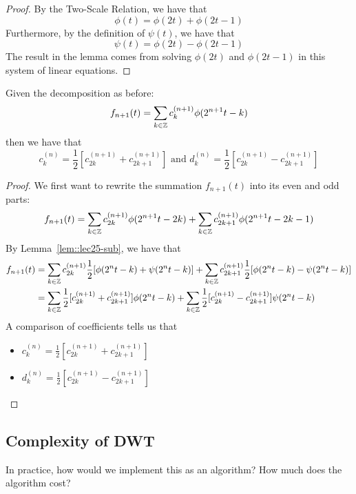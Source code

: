 \documentclass{article}
\begin{document}
\begin{proof}
    By the Two-Scale Relation, we have that
    \[\phi(t) = \phi(2t) + \phi(2t - 1)\]
    Furthermore, by the definition of $\psi(t)$, we have that
    \[\psi(t) = \phi(2t) - \phi(2t - 1)\]
    The result in the lemma comes from solving $\phi(2t)$ and $\phi(2t - 1)$ in this system of linear equations.
\end{proof}

\begin{proposition}\label{prop::lec25-rewrite-rule}
    Given the decomposition as before:
    \[f_{n + 1}(t) = \sum_{k \in \mathbb{Z}} c_k^{(n+1)} \phi(2^{n+1} t - k)\]
    then we have that
    \[c_k^{(n)} = \frac{1}{2} [c_{2k}^{(n+1)} + c_{2k+1}^{(n+1)}] \text{ and } d_k^{(n)} = \frac{1}{2} [c_{2k}^{(n+1)} - c_{2k+1}^{(n+1)}]\]
\end{proposition}

\begin{proof}
    We first want to rewrite the summation $f_{n+1}(t)$ into its even and odd parts:
    \[f_{n+1}(t) = \sum_{k \in \mathbb{Z}} c_{2k}^{(n+1)} \phi(2^{n+1} t - 2k) + \sum_{k \in \mathbb{Z}} c_{2k+1}^{(n+1)} \phi(2^{n+1} t - 2k - 1)\]
    By Lemma~\ref{lem::lec25-sub}, we have that
    \begin{align*}
        f_{n+1}(t) &= \sum_{k \in \mathbb{Z}} c_{2k}^{(n+1)} \frac{1}{2} [\phi(2^n t - k) + \psi(2^n t - k)] + \sum_{k \in \mathbb{Z}} c_{2k+1}^{(n+1)} \frac{1}{2} [\phi(2^n t - k) - \psi(2^n t - k)]\\
        &= \sum_{k \in \mathbb{Z}} \frac{1}{2}[c_{2k}^{(n+1)} + c_{2k+1}^{(n+1)}] \phi(2^n t - k) + \sum_{k \in \mathbb{Z}} \frac{1}{2} [c_{2k}^{(n+1)} - c_{2k+1}^{(n+1)}] \psi(2^n t - k)
    \end{align*}
    A comparison of coefficients tells us that
    \begin{itemize}
        \item $c_k^{(n)} = \frac{1}{2} [c_{2k}^{(n+1)} + c_{2k+1}^{(n+1)}]$
        \item $d_k^{(n)} = \frac{1}{2} [c_{2k}^{(n+1)} - c_{2k+1}^{(n+1)}]$
    \end{itemize}
\end{proof}

\subsection{Complexity of DWT}

\begin{question}
    In practice, how would we implement this as an algorithm? How much does the algorithm cost?
\end{question}
\end{document}
